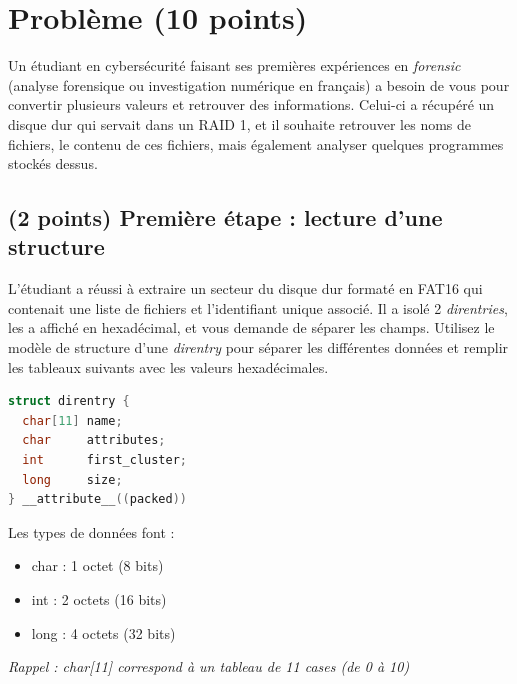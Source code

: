 \documentclass[11pt,a4paper]{article}
\begin{document}
\bigskip


\section{Problème (10 points)}


Un étudiant en cybersécurité faisant ses premières expériences en \textit{forensic} (analyse forensique ou investigation numérique en français) a besoin de vous pour convertir plusieurs valeurs et retrouver des informations.
Celui-ci a récupéré un disque dur qui servait dans un RAID 1, et il souhaite retrouver les noms de fichiers, le contenu de ces fichiers, mais également analyser quelques programmes stockés dessus.

\bigskip

\subsection{(2 points) Première étape : lecture d'une structure }

L'étudiant a réussi à extraire un secteur du disque dur formaté en FAT16 qui contenait une liste de fichiers et l'identifiant unique associé.
Il a isolé 2 \textit{direntries}, les a affiché en hexadécimal, et vous demande de séparer les champs.
Utilisez le modèle de structure d'une \textit{direntry} pour séparer les différentes données et remplir les tableaux suivants avec les valeurs hexadécimales.

\newpage

\begin{table}[ht!]
  \centering
  \begin{minipage}{0.45\textwidth}
    \centering
\begin{lstlisting}[language=C]
struct direntry {
  char[11] name;
  char     attributes;
  int      first_cluster;
  long     size;
} __attribute__((packed)) \end{lstlisting}
  \end{minipage}
  \hfillx
  \begin{minipage}{0.45\textwidth}
Les types de données font :

\begin{itemize}
\item char : 1 octet (8 bits)
\item int : 2 octets (16 bits)
\item long : 4 octets (32 bits)
\end{itemize}

\textit{Rappel : char[11] correspond à un tableau de 11 cases (de 0 à 10)}
  \end{minipage}
\end{table}
\end{document}
